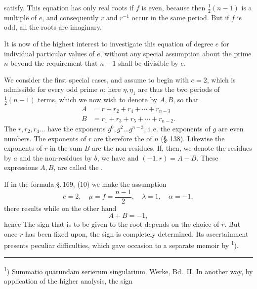 
satisfy. This equation has only real roots if $f$ is even, because then $\tfrac{1}{2}(n - 1)$ is a multiple of $e$, and consequently $r$ and $r^{-1}$ occur in the same period. But if $f$ is odd, all the roots are imaginary.

It is now of the highest interest to investigate this equation of degree $e$ for individual particular values of $e$, without any special assumption about the prime $n$ beyond the requirement that $n - 1$ shall be divisible by $e$.

We consider the first special cases, and assume to begin with $e = 2$, which is admissible for every odd prime $n$; here $\eta, \eta_1$ are thus the two periods of $\tfrac{1}{2}(n - 1)$ terms, which we now wish to denote by $A, B$, so that
\[
\begin{aligned}
A &= r + r_2 + r_4 + \cdots + r_{n-3}\\
B &= r_1 + r_3 + r_5 + \cdots + r_{n-2}.
\end{aligned}
\]
The $r, r_2, r_4 \ldots$ have the exponents $g^0, g^2 \ldots g^{n-3}$, i.\,e. the exponents of $g$ are even numbers. The exponents of $r$ are therefore the  of $n$ (\S.\,138). Likewise the exponents of $r$ in the sum $B$ are the non-residues. If, then, we denote the residues by $a$ and the non-residues by $b$, we have
and $(-1, r) = A - B$. These expressions $A, B$, are called the .

If in the formula \S.\,169, (10) we make the assumption
\[
e = 2, \quad \mu = f = \frac{n-1}{2}, \quad \lambda = 1, \quad \alpha = -1,
\]
there results
while on the other hand
\[
A + B = -1,
\]
hence
The sign that is to be given to the root depends on the choice of $r$. But once $r$ has been fixed upon, the sign is completely determined. Its ascertainment presents peculiar difficulties, which gave occasion to a separate memoir by \textsuperscript{1}).

\noindent\rule{3cm}{0.4pt}

\noindent\textsuperscript{1}) Summatio quarundam serierum singularium.  Werke, Bd.\ II. In another way, by application of the higher analysis, the sign
